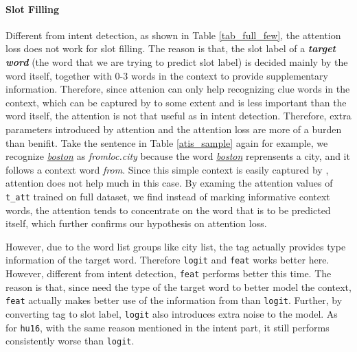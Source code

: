 \paragraph{Slot Filling}

Different from intent detection, as shown in Table \ref{tab_full_few}, the attention loss does not work for slot filling.
The reason is that, the slot label of a \textbf{\emph{target word}} (the word that we are trying to predict slot label) is decided mainly by the word itself, together with 0-3 words in the context to provide supplementary information.
Therefore, since attenion can only help recognizing clue words in the context, which can be captured by \BLSTM to some extent and is less important than the word itself, the attention is not that useful as in intent detection.
Therefore, extra parameters introduced by attention and the attention loss are more of a burden than benifit.
Take the sentence in Table \ref{atis_sample} again for example, we recognize \textsl{\underline{boston}} as \emph{fromloc.city} because the word \textsl{\underline{boston}} reprensents a city, and it follows a context word \emph{from}. Since this simple context is easily captured by \BLSTM, attention does not help much in this case.
By examing the attention values of \texttt{t\_att} trained on full dataset,
we find instead of marking informative context words, the attention tends to concentrate on the word that is to be predicted itself, which further confirms our hypothesis on attention loss.

However, due to the word list \RE groups like city list, the \RE tag actually provides type information of the target word.
Therefore \texttt{logit} and \texttt{feat} works better here.
However, different from intent detection, \texttt{feat} performs better this time.
The reason is that, since \BLSTM need the type of the target word to better model the context, \texttt{feat} actually makes better use of the information from \RE than \texttt{logit}.
Further, by converting \RE tag to slot label, \texttt{logit} also introduces extra noise to the model.
As for \texttt{hu16}, with the same reason mentioned in the intent part, it still performs consistently worse than \texttt{logit}.


